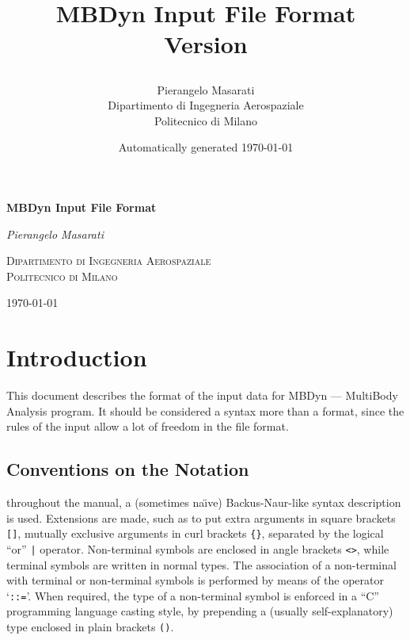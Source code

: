 \documentclass[10pt,dvips]{report}
\newcommand{\kw}[1]{\texttt{#1}}
\begin{document}
\begin{latexonly}
\title{\bf MBDyn Input File Format \\
Version

}
\author{Pierangelo Masarati \vspace{5mm}\\
    \sc Dipartimento di Ingegneria Aerospaziale \\
    \sc Politecnico di Milano}
\date{Automatically generated \today}
\maketitle
\end{latexonly}

\begin{htmlonly}
\begin{center}
\textbf{\LARGE MBDyn Input File Format}

\emph{\large Pierangelo Masarati}

\textsc{Dipartimento di Ingegneria Aerospaziale \\ Politecnico di Milano}

\today
\end{center}
\end{htmlonly}




\tableofcontents
\newpage

\chapter{Introduction}
This document describes the format of the input data for MBDyn ---
MultiBody Analysis program.
It should be considered a syntax more than a format, since the rules of the
input allow a lot of freedom in the file format. 

\section{Conventions on the Notation}
throughout the manual, a (sometimes na\"{\i}ve) 
Backus-Naur-like syntax description is used. 
Extensions are made, such as to put extra arguments in square brackets
\kw{[]}, mutually exclusive arguments in curl brackets \kw{\{\}},
separated by the logical ``or'' \kw{|} operator.
Non-terminal symbols are enclosed in angle brackets \kw{<>}, while
terminal symbols are written in normal types.
The association of a non-terminal with terminal or non-terminal
symbols is performed by means of the operator `\kw{::=}'. 
When required, the type of a non-terminal symbol is enforced in a ``C''
programming language casting style, by prepending a (usually
self-explanatory) type enclosed in plain brackets \kw{()}.
\end{document}
